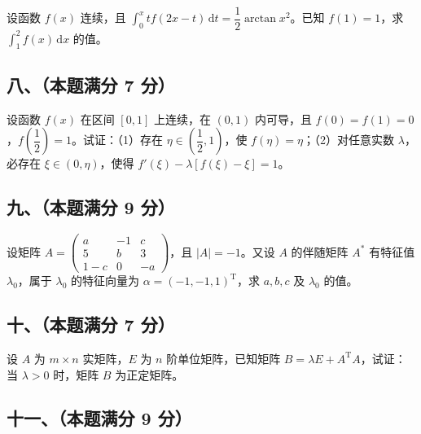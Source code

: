 \documentclass[UTF8,12pt]{ctexart}
\begin{document}
设函数 \(\displaystyle f(x)\) 连续，且 \(\displaystyle \int_0^x t f(2x-t)\,\mathrm dt=\dfrac{\displaystyle 1}{\displaystyle 2}\arctan x^2\)。已知 \(\displaystyle f(1)=1\)，求 \(\displaystyle \int_1^2 f(x)\,\mathrm dx\) 的值。


\subsection*{八、（本题满分 7 分）}

设函数 \(\displaystyle f(x)\) 在区间 \(\displaystyle [0,\allowbreak 1]\) 上连续，在 \(\displaystyle (0,\allowbreak 1)\) 内可导，且 \(\displaystyle f(0)=f(1)=0\)，\(\displaystyle f(\dfrac{\displaystyle 1}{\displaystyle 2})=1\)。试证：（1）存在 \(\displaystyle \eta\in(\dfrac{\displaystyle 1}{\displaystyle 2},\allowbreak 1)\)，使 \(\displaystyle f(\eta)=\eta\)；（2）对任意实数 \(\displaystyle \lambda\)，必存在 \(\displaystyle \xi\in(0,\allowbreak \eta)\)，使得 \(\displaystyle f'(\xi)-\lambda[f(\xi)-\xi]=1\)。


\subsection*{九、（本题满分 9 分）}

设矩阵 \(\displaystyle A=\begin{pmatrix}a&-1&c\\5&b&3\\1-c&0&-a\end{pmatrix}\)，且 \(\displaystyle |A|=-1\)。又设 \(\displaystyle A\) 的伴随矩阵 \(\displaystyle A^*\) 有特征值 \(\displaystyle \lambda_0\)，属于 \(\displaystyle \lambda_0\) 的特征向量为 \(\displaystyle \alpha=(-1,\allowbreak -1,\allowbreak 1)^{\mathrm T}\)，求 \(\displaystyle a,\allowbreak b,\allowbreak c\) 及 \(\displaystyle \lambda_0\) 的值。


\subsection*{十、（本题满分 7 分）}

设 \(\displaystyle A\) 为 \(\displaystyle m\times n\) 实矩阵，\(\displaystyle E\) 为 \(\displaystyle n\) 阶单位矩阵，已知矩阵 \(\displaystyle B=\lambda E+A^{\mathrm T}A\)，试证：当 \(\displaystyle \lambda>0\) 时，矩阵 \(\displaystyle B\) 为正定矩阵。


\subsection*{十一、（本题满分 9 分）}
\end{document}
